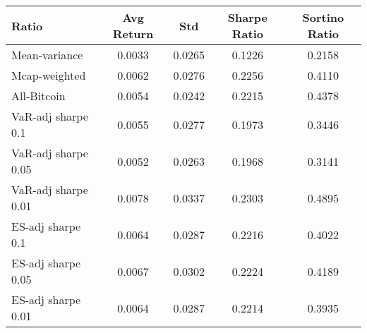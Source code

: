 \begin{tabular}{lcccc}
\toprule
Ratio & Avg Return & Std & Sharpe Ratio & Sortino Ratio\\
\midrule
Mean-variance & 0.0033 & 0.0265 & 0.1226 & 0.2158\\
Mcap-weighted & 0.0062 & 0.0276 & 0.2256 & 0.4110\\
All-Bitcoin & 0.0054 & 0.0242 & 0.2215 & 0.4378\\
VaR-adj sharpe 0.1 & 0.0055 & 0.0277 & 0.1973 & 0.3446\\
VaR-adj sharpe 0.05 & 0.0052 & 0.0263 & 0.1968 & 0.3141\\
VaR-adj sharpe 0.01 & 0.0078 & 0.0337 & 0.2303 & 0.4895\\
ES-adj sharpe 0.1 & 0.0064 & 0.0287 & 0.2216 & 0.4022\\
ES-adj sharpe 0.05 & 0.0067 & 0.0302 & 0.2224 & 0.4189\\
ES-adj sharpe 0.01 & 0.0064 & 0.0287 & 0.2214 & 0.3935\\
\bottomrule
\end{tabular}
